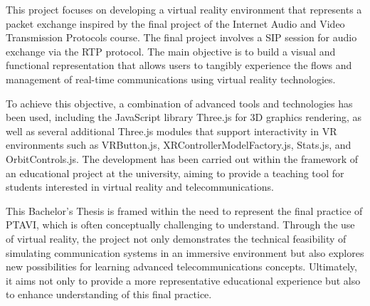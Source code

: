 \documentclass[a4paper, 12pt]{book}
\begin{document}
This project focuses on developing a virtual reality environment that represents a packet exchange inspired by the final project of the Internet Audio and 
Video Transmission Protocols course. The final project involves a SIP session for audio exchange via the RTP protocol. The main objective is to build a visual 
and functional representation that allows users to tangibly experience the flows and management of real-time communications using virtual reality technologies.

\bigskip

To achieve this objective, a combination of advanced tools and technologies has been used, including the JavaScript library Three.js for 3D graphics rendering, 
as well as several additional Three.js modules that support interactivity in VR environments such as VRButton.js, XRControllerModelFactory.js, Stats.js, 
and OrbitControls.js. The development has been carried out within the framework of an educational project at the university, aiming to provide a teaching tool 
for students interested in virtual reality and telecommunications.

\bigskip

This Bachelor's Thesis is framed within the need to represent the final practice of PTAVI, which is often conceptually challenging to understand. 
Through the use of virtual reality, the project not only demonstrates the technical feasibility of simulating communication systems in an immersive environment 
but also explores new possibilities for learning advanced telecommunications concepts. Ultimately, it aims not only to provide a more representative educational 
experience but also to enhance understanding of this final practice.




\tableofcontents 
\cleardoublepage
\listoffigures %
\end{document}
